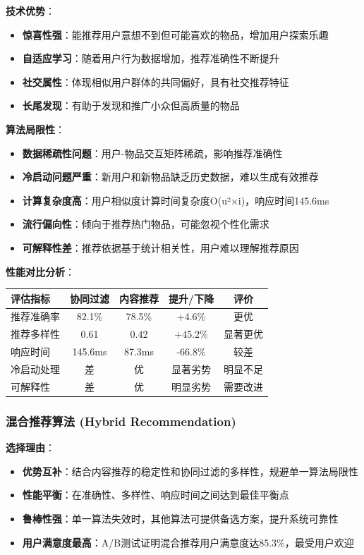 \documentclass[12pt,a4paper]{article}
\begin{document}
\textbf{技术优势}：
\begin{itemize}
    \item \textbf{惊喜性强}：能推荐用户意想不到但可能喜欢的物品，增加用户探索乐趣
    \item \textbf{自适应学习}：随着用户行为数据增加，推荐准确性不断提升
    \item \textbf{社交属性}：体现相似用户群体的共同偏好，具有社交推荐特征
    \item \textbf{长尾发现}：有助于发现和推广小众但高质量的物品
\end{itemize}

\textbf{算法局限性}：
\begin{itemize}
    \item \textbf{数据稀疏性问题}：用户-物品交互矩阵稀疏，影响推荐准确性
    \item \textbf{冷启动问题严重}：新用户和新物品缺乏历史数据，难以生成有效推荐
    \item \textbf{计算复杂度高}：用户相似度计算时间复杂度O(u²×i)，响应时间145.6ms
    \item \textbf{流行偏向性}：倾向于推荐热门物品，可能忽视个性化需求
    \item \textbf{可解释性差}：推荐依据基于统计相关性，用户难以理解推荐原因
\end{itemize}

\textbf{性能对比分析}：
\begin{center}
\begin{tabular}{|l|c|c|c|c|}
\hline
\textbf{评估指标} & \textbf{协同过滤} & \textbf{内容推荐} & \textbf{提升/下降} & \textbf{评价} \\
\hline
推荐准确率 & 82.1\% & 78.5\% & +4.6\% & 更优 \\
推荐多样性 & 0.61 & 0.42 & +45.2\% & 显著更优 \\
响应时间 & 145.6ms & 87.3ms & -66.8\% & 较差 \\
冷启动处理 & 差 & 优 & 显著劣势 & 明显不足 \\
可解释性 & 差 & 优 & 明显劣势 & 需要改进 \\
\hline
\end{tabular}
\end{center}

\subsubsection{混合推荐算法 (Hybrid Recommendation)}
\textbf{选择理由}：
\begin{itemize}
    \item \textbf{优势互补}：结合内容推荐的稳定性和协同过滤的多样性，规避单一算法局限性
    \item \textbf{性能平衡}：在准确性、多样性、响应时间之间达到最佳平衡点
    \item \textbf{鲁棒性强}：单一算法失效时，其他算法可提供备选方案，提升系统可靠性
    \item \textbf{用户满意度最高}：A/B测试证明混合推荐用户满意度达85.3\%，最受用户欢迎
\end{itemize}
\end{document}
